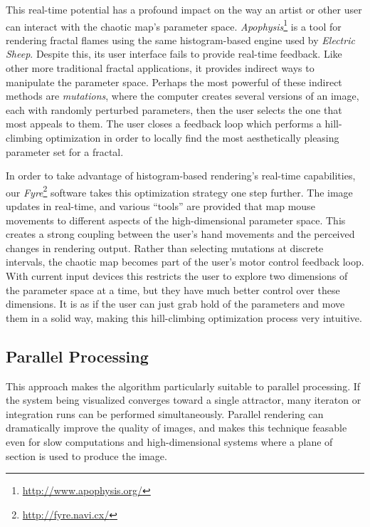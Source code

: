 \documentclass[letterpaper, 12pt]{article}
\begin{document}
This real-time potential has a profound impact on the way an artist or other user can
interact with the chaotic map's parameter space. \emph{Apophysis}\footnote{\url{http://www.apophysis.org/}}
is a tool for rendering fractal flames using the same histogram-based engine used by \emph{Electric Sheep}.
Despite this, its user interface fails to provide real-time feedback. Like other more traditional
fractal applications, it provides indirect ways to manipulate the parameter space. Perhaps the most
powerful of these indirect methods are \emph{mutations}, where the computer creates several versions
of an image, each with randomly perturbed parameters, then the user selects the one that most appeals
to them. The user closes a feedback loop which performs a hill-climbing optimization in order
to locally find the most aesthetically pleasing parameter set for a fractal.

In order to take advantage of histogram-based rendering's real-time capabilities, our
\emph{Fyre}\footnote{\url{http://fyre.navi.cx/}} software takes this optimization strategy one step
further. The image updates in real-time, and various ``tools'' are provided that map mouse movements
to different aspects of the high-dimensional parameter space. This creates a strong coupling
between the user's hand movements and the perceived changes in rendering output. Rather than
selecting mutations at discrete intervals, the chaotic map becomes part of the user's motor control
feedback loop. With current input devices this restricts the user to explore two dimensions of the
parameter space at a time, but they have much better control over these dimensions. It is as if the
user can just grab hold of the parameters and move them in a solid way, making this hill-climbing
optimization process very intuitive.

\subsection{Parallel Processing}
This approach makes the algorithm particularly suitable to parallel processing.  If the
system being visualized converges toward a single attractor, many iteraton or integration
runs can be performed simultaneously.
Parallel rendering can dramatically improve the quality of images, and makes
this technique feasable even for slow computations and high-dimensional systems where a
plane of section is used to produce the image.
\end{document}
